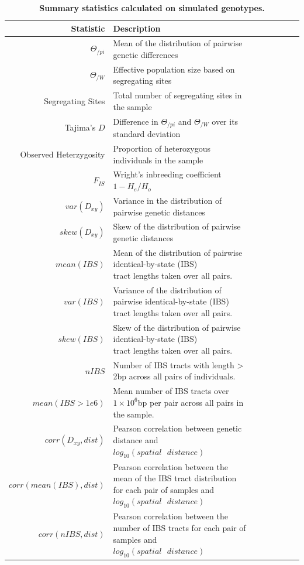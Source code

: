\documentclass[11pt,twoside,lineno]{preprint}
\begin{document}
\begin{table}
\small
\centering
\caption{\bf Summary statistics calculated on simulated genotypes.}
\begin{tabular}{rllrrrrr}
  \hline
Statistic & Description \\ 
  \hline
$\Theta_{/pi}$ & Mean of the distribution of pairwise genetic differences \\
$\Theta_{/W}$ & Effective population size based on segregating sites \\
Segregating Sites & Total number of segregating sites in the sample \\
Tajima's $D$ & Difference in $\Theta_{/pi}$ and $\Theta_{/W}$ over its standard deviation\\
Observed Heterzygosity & Proportion of heterozygous individuals in the sample \\
$F_{IS}$ & Wright's inbreeding coefficient $1-H_{e}/H_{o}$ \\
$var(D_{xy})$ & Variance in the distribution of pairwise genetic distances \\
$skew(D_{xy})$ & Skew of the distribution of pairwise genetic distances \\
$mean(IBS)$ & \makecell[l]{Mean of the distribution of pairwise identical-by-state (IBS) \\tract lengths taken over all pairs.} \\
$var(IBS)$ & \makecell[l]{Variance of the distribution of pairwise identical-by-state (IBS) \\tract lengths taken over all pairs.} \\
$skew(IBS)$ & \makecell[l]{Skew of the distribution of pairwise identical-by-state (IBS) \\tract lengths taken over all pairs.} \\
$nIBS$ & Number of IBS tracts with length > 2bp across all pairs of individuals. \\
$mean(IBS>1e6)$ & \makecell[l]{Mean number of IBS tracts over $1\times10^6$bp per pair \\across all pairs in the sample.} \\ 
$corr(D_{xy},dist)$ & Pearson correlation between genetic distance and $log_{10}(spatial\text{ }distance)$ \\
$corr(mean(IBS),dist)$ & \makecell[l]{Pearson correlation between the mean of the IBS tract distribution \\for each pair of samples and $log_{10}(spatial\text{ }distance)$} \\
$corr(nIBS,dist)$ & \makecell[l]{Pearson correlation between the number of IBS tracts \\for each pair of samples and $log_{10}(spatial\text{ }distance)$} \\

\end{tabular}
\end{table}
\end{document}
